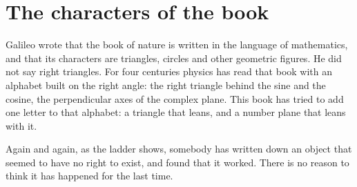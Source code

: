 \section*{The characters of the book}
{}

Galileo wrote that the book of nature is written in the language of mathematics, and that its characters are triangles, circles and other geometric figures. He did not say right triangles. For four centuries physics has read that book with an alphabet built on the right angle: the right triangle behind the sine and the cosine, the perpendicular axes of the complex plane. This book has tried to add one letter to that alphabet: a triangle that leans, and a number plane that leans with it.

Again and again, as the ladder shows, somebody has written down an object that seemed to have no right to exist, and found that it worked. There is no reason to think it has happened for the last time.
